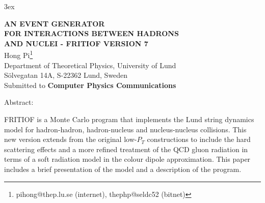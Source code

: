 \textwidth 440pt
\raggedbottom
\textheight 594pt
\topmargin 72pt
\headheight 0pt
\headsep 0pt
\footskip 54pt
\oddsidemargin 0pt
\parindent 0in
\parskip 3ex
\renewcommand{\textfraction}{0.2}    %
\renewcommand{\topfraction}{0.8}
\renewcommand{\bottomfraction}{0.4}
\renewcommand{\floatpagefraction}{0.8}

\newcommand{\ee}{$e^{+}e^{-}$}
\newcommand{\lsim}{\:\raise -4pt\hbox{$\stackrel{\textstyle <} {\sim}$}\:}
\newcommand{\ipt}{ {\cal P}_T }


\begin{titlepage}



\vspace{0.2in}
\LARGE
%
\begin{center}
{\bf AN EVENT GENERATOR \\FOR INTERACTIONS BETWEEN HADRONS \\AND NUCLEI 
- FRITIOF VERSION 7 }\\ 
\vspace{.5in}
%
\large
Hong Pi\footnote{pihong@thep.lu.se (internet), thephp@seldc52 (bitnet) }\\
\vspace{0.2in}
Department of Theoretical Physics, University of Lund\\
S\"{o}lvegatan 14A, S-22362 Lund, Sweden\\
%
\vspace{0.5in}
Submitted to {\bf Computer Physics Communications}\\
\vspace{0.2in}
\end{center}


\large 
\vspace{0.4in}
Abstract:

FRITIOF is a Monte Carlo program that implements the Lund string dynamics model for hadron-hadron, hadron-nucleus and nucleus-nucleus collisions.  
This new version extends from the original low-$P_T$ 
constructions to include the hard scattering effects and a more refined
treatment of the QCD gluon radiation in terms of a soft radiation model in
the colour dipole approximation.  This paper includes a brief presentation
of the model and a description of the program.


\end{titlepage}

